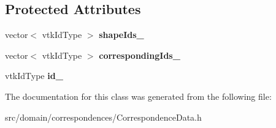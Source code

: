 \subsection*{Protected Attributes}
\begin{DoxyCompactItemize}
\item 
\hypertarget{class_correspondence_data_a9d064aa6c9252072cdf8537929261dad}{}vector$<$ vtk\+Id\+Type $>$ {\bfseries shape\+Ids\+\_\+}\label{class_correspondence_data_a9d064aa6c9252072cdf8537929261dad}

\item 
\hypertarget{class_correspondence_data_a5a4e8a0ecbbf3a029a7b453407b363f8}{}vector$<$ vtk\+Id\+Type $>$ {\bfseries corresponding\+Ids\+\_\+}\label{class_correspondence_data_a5a4e8a0ecbbf3a029a7b453407b363f8}

\item 
\hypertarget{class_correspondence_data_a5f5964ac0e1e46f9010dcef28f42bd35}{}vtk\+Id\+Type {\bfseries id\+\_\+}\label{class_correspondence_data_a5f5964ac0e1e46f9010dcef28f42bd35}

\end{DoxyCompactItemize}


The documentation for this class was generated from the following file\+:\begin{DoxyCompactItemize}
\item 
src/domain/correspondences/Correspondence\+Data.\+h\end{DoxyCompactItemize}
